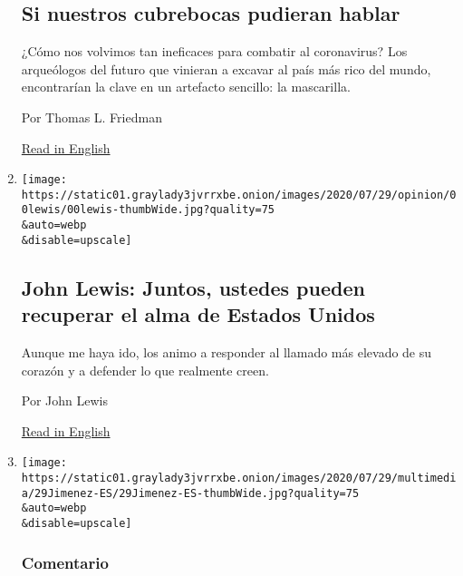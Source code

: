 \begin{enumerate}
  \hypertarget{si-nuestros-cubrebocas-pudieran-hablar}{%
  \subsection{Si nuestros cubrebocas pudieran
  hablar}\label{si-nuestros-cubrebocas-pudieran-hablar}}

  ¿Cómo nos volvimos tan ineficaces para combatir al coronavirus? Los
  arqueólogos del futuro que vinieran a excavar al país más rico del
  mundo, encontrarían la clave en un artefacto sencillo: la mascarilla.

  Por Thomas L. Friedman

  \href{https://www.nytimes3xbfgragh.onion/2020/07/28/opinion/coronavirus-masks.html}{Read
  in English}
\item
  \href{/es/2020/07/30/espanol/opinion/john-lewis-derechos-civiles.html}{}

  \texttt{[image: https://static01.graylady3jvrrxbe.onion/images/2020/07/29/opinion/00lewis/00lewis-thumbWide.jpg?quality=75\\\&auto=webp\\\&disable=upscale]}

  \hypertarget{john-lewis-juntos-ustedes-pueden-recuperar-el-alma-de-estados-unidos}{%
  \subsection{John Lewis: Juntos, ustedes pueden recuperar el alma de
  Estados
  Unidos}\label{john-lewis-juntos-ustedes-pueden-recuperar-el-alma-de-estados-unidos}}

  Aunque me haya ido, los animo a responder al llamado más elevado de su
  corazón y a defender lo que realmente creen.

  Por John Lewis

  \href{https://www.nytimes3xbfgragh.onion/2020/07/30/opinion/john-lewis-civil-rights-america.html}{Read
  in English}
\item
  \href{/es/2020/07/29/espanol/opinion/espana-felipe-gonzalez-jose-maria-aznar.html}{}

  \texttt{[image: https://static01.graylady3jvrrxbe.onion/images/2020/07/29/multimedia/29Jimenez-ES/29Jimenez-ES-thumbWide.jpg?quality=75\\\&auto=webp\\\&disable=upscale]}

  \hypertarget{comentario-8}{%
  \subsubsection{Comentario}\label{comentario-8}}


\end{enumerate}
